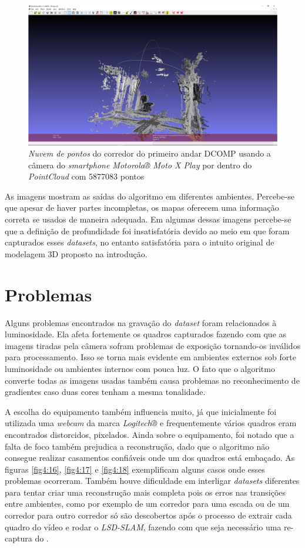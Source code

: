 \begin{figure}[H]
	\centering
		\includegraphics[width= \textwidth]{Imagens/corredorMotoxdentro.PNG}
	\caption{\textit{Nuvem de pontos} do corredor do primeiro andar DCOMP usando a câmera do \textit{smartphone Motorola® Moto X Play} por dentro do \textit{PointCloud} com 5877083 pontos}
\end{figure}

As imagens mostram as saídas do algoritmo em diferentes ambientes. Percebe-se que apesar de haver partes incompletas, os mapas oferecem uma informação correta se usados de maneira adequada. Em algumas dessas imagens percebe-se que a definição de profundidade foi insatisfatória devido ao meio em que foram capturados esses \textit{datasets}, no entanto satisfatória para o intuito original de modelagem 3D proposto na introdução.

\section{Problemas}

Alguns problemas encontrados na gravação do \textit{dataset} foram relacionados à luminosidade. Ela afeta fortemente os quadros capturados fazendo com que as imagens tiradas pela câmera sofram problemas de exposição tornando-os inválidos para processamento. Isso se torna mais evidente em ambientes externos sob forte luminosidade ou ambientes internos com pouca luz. O fato que o algoritmo converte todas as imagens usadas também causa problemas no reconhecimento de gradientes caso duas cores tenham a mesma tonalidade. 

A escolha do equipamento também influencia muito, já que inicialmente foi utilizada uma \textit{webcam} da marca \textit{Logitech®} e frequentemente vários quadros eram encontrados distorcidos, pixelados. Ainda sobre o equipamento, foi notado que a falta de foco também prejudica a reconstrução, dado que o algoritmo não consegue realizar casamentos confiáveis onde um dos quadros está embaçado. As figuras \ref{fig4:16}, \ref{fig4:17} e \ref{fig4:18}  exemplificam alguns casos onde esses problemas ocorreram. Também houve dificuldade em interligar  \textit{datasets} diferentes para tentar criar uma reconstrução mais completa pois os erros nas transições entre ambientes, como por exemplo de um corredor para uma escada ou de um corredor para outro corredor só são descobertos após o processo de extrair cada quadro do vídeo e rodar o \textit{LSD-SLAM}, fazendo com que seja necessário uma re-captura do . 

